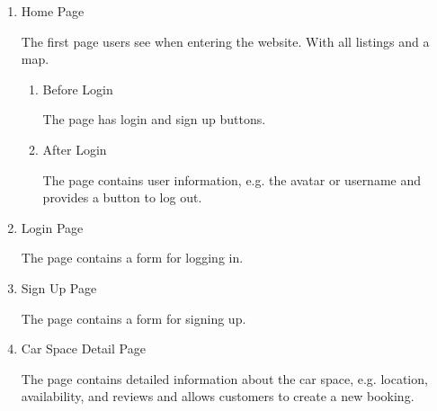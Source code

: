 \documentclass[12pt]{article}
\begin{document}
  \begin{enumerate}
    \item
    \begin{description}
      \item[Home Page]
    \end{description}
    
    The first page users see when entering the website. With all listings and a map.

      \begin{enumerate}
        \item
        \begin{description}
          \item[Before Login]
        \end{description}

        The page has login and sign up buttons.

        \item     
        \begin{description}
          \item[After Login]
        \end{description}

        The page contains user information, e.g. the avatar or username and provides a button to log out.
      \end{enumerate}

    \item
    \begin{description}
      \item[Login Page]
    \end{description}

    The page contains a form for logging in.
  
    \item
    \begin{description}
      \item[Sign Up Page]
    \end{description}
  
    The page contains a form for signing up.

    \item
    \begin{description}
      \item[Car Space Detail Page]
    \end{description}
  
    The page contains detailed information about the car space, e.g. location, availability, and reviews and allows customers to create a new booking.
  

\end{enumerate}
\end{document}
